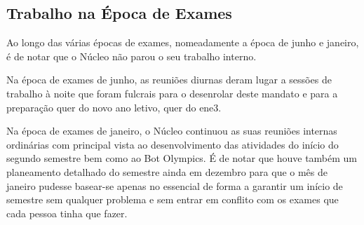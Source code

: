
\subsection{Trabalho na Época de Exames}

Ao longo das várias épocas de exames, nomeadamente a época de junho e janeiro, é de notar que o Núcleo não parou o seu trabalho interno.

Na época de exames de junho, as reuniões diurnas deram lugar a sessões de trabalho à noite que foram fulcrais para o desenrolar deste mandato e para a preparação quer do novo ano letivo, quer do \acrshort{ene3}.

Na época de exames de janeiro, o Núcleo continuou as suas reuniões internas ordinárias com principal vista ao desenvolvimento das atividades do início do segundo semestre bem como ao Bot Olympics. É de notar que houve também um planeamento detalhado do semestre ainda em dezembro para que o mês de janeiro pudesse basear-se apenas no essencial de forma a garantir um início de semestre sem qualquer problema e sem entrar em conflito com os exames que cada pessoa tinha que fazer.